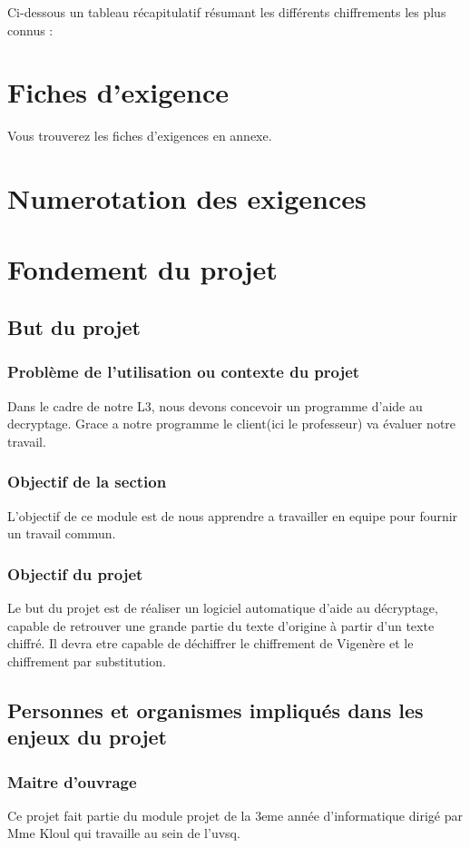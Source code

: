 \documentclass[a4]{article}
\begin{document}
				Ci-dessous un tableau récapitulatif résumant les différents chiffrements les plus connus :
				
				
				
		\section{Fiches d'exigence}
				Vous trouverez les fiches d'exigences en annexe.
	\section{Numerotation des exigences}
				 
		
	\section{Fondement du projet}
		\subsection{But du projet} 
			\subsubsection{Problème de l'utilisation ou contexte du projet}
				Dans le cadre de notre L3, nous devons concevoir un programme d'aide au decryptage.
				Grace a notre programme le client(ici le professeur) va évaluer notre travail.
			\subsubsection{Objectif de la section}
				L'objectif de ce module est de nous apprendre a travailler en equipe pour fournir un travail commun.
			\subsubsection{Objectif du projet}
				Le but du projet est de réaliser un logiciel automatique d'aide au décryptage, capable de retrouver une grande partie du texte d'origine à partir d'un texte chiffré. Il devra etre capable de déchiffrer le chiffrement de Vigenère et le chiffrement par substitution.
		\subsection{Personnes et organismes impliqués dans les enjeux du projet} 
			\subsubsection{Maitre d'ouvrage}
				Ce projet fait partie du module projet de la 3eme année d'informatique dirigé par Mme Kloul qui travaille au sein de l'uvsq.			
\end{document}
